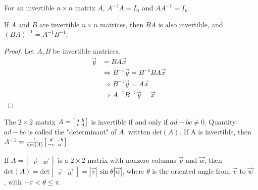 \documentclass[a4paper,8pt]{article}
\begin{document}
\begin{outline}
    For an invertible \(n \times n\) matrix \(A\), \(A^{-1}A = I_n\) and \(AA^{-1} = I_n\).

    If \(A\) and \(B\) are invertible \(n \times n\) matrices, then \(BA\) is also invertible, and
    \((BA)^{-1} = A^{-1}B^{-1}\).

    \begin{proof}
      Let \(A,B\) be invertible matrices.
      \begin{align*}
        \vec{y} &= BA\vec{x}                                 \\
                &\Rightarrow B^{-1}\vec{y} = B^{-1}BA\vec{x} \\
                &\Rightarrow B^{-1}\vec{y} = A\vec{x}        \\
                &\Rightarrow A^{-1}B^{-1}\vec{y} = \vec{x}
      \end{align*}
    \end{proof}

    The \(2 \times 2\) matrix \(A = \begin{bsmallmatrix} a & b \\ c & d \end{bsmallmatrix}\) is invertible if and only
    if \(ad-bc \neq 0\). Quantity \(ad - bc\) is called the "determinant" of \(A\), written \(\text{det}(A)\).
    If A is invertible, then \(A^{-1} = \frac{1}{\text{det}(A)} \begin{bsmallmatrix} d & -b \\ -c & a \end{bsmallmatrix}\).

    If \(A = \begin{bmatrix} \vec{v} & \vec{w} \end{bmatrix}\) is a \(2 \times 2\) matrix with nonzero columns
    \(\vec{v}\) and \(\vec{w}\), then \(\text{det}(A) = \text{det}\begin{bmatrix} \vec{v} & \vec{w} \end{bmatrix} =
    |\vec{v}|\sin{\theta}|\vec{w}|\), where \(\theta\) is the oriented angle from \(\vec{v}\) to \(\vec{w}\),
    with \(-\pi < \theta \leq \pi\).


\end{outline}
\end{document}
